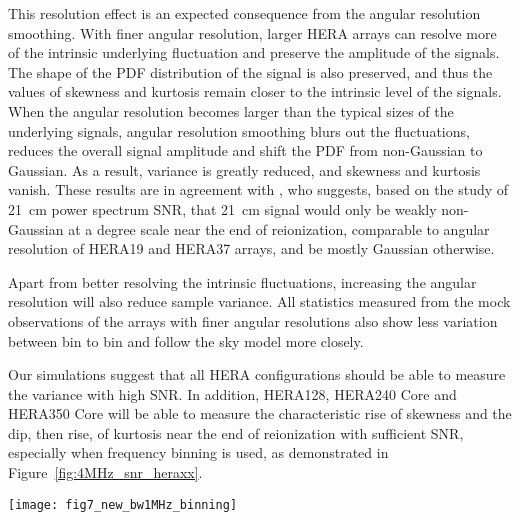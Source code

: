 \documentclass[fleqn,usenatbib]{mnras}
\begin{document}
This resolution effect is an expected consequence from the angular resolution smoothing. With finer angular resolution, larger HERA arrays can resolve more of the intrinsic underlying fluctuation and preserve the amplitude of the signals. The shape of the PDF distribution of the signal is also preserved, and thus the values of skewness and kurtosis remain closer to the intrinsic level of the signals. When the angular resolution becomes larger than the typical sizes of the underlying signals, angular resolution smoothing blurs out the fluctuations, reduces the overall signal amplitude and shift the PDF from non-Gaussian to Gaussian. As a result, variance is greatly reduced, and skewness and kurtosis vanish. These results are in agreement with \citet{2015MNRAS.449L..41M}, who suggests, based on the study of 21~cm power spectrum SNR, that 21~cm signal would only be weakly non-Gaussian at a degree scale near the end of reionization, comparable to angular resolution of HERA19 and HERA37 arrays, and be mostly Gaussian otherwise.

Apart from better resolving the intrinsic fluctuations, increasing the angular resolution will also reduce sample variance. All statistics measured from the mock observations of the arrays with finer angular resolutions also show less variation between bin to bin and follow the sky model more closely.

Our simulations suggest that all HERA configurations should be able to measure the variance with high SNR. In addition, HERA128, HERA240 Core and HERA350 Core will be able to measure the characteristic rise of skewness and the dip, then rise, of kurtosis near the end of reionization with sufficient SNR, especially when frequency binning is used, as demonstrated in Figure~\ref{fig:4MHz_snr_heraxx}. 

\begin{figure*}
    \texttt{[image: fig7\_new\_bw1MHz\_binning]}
    \caption{Mean drift scan statistics (left) and SNR (right) measured from the mock observations of all planned built-out HERA stages with 1-MHz frequency binning applied before the calculations. All HERA configurations should be able to measure the variance with high SNR. In addition, HERA128 and above will be able to measure the characteristic rise of skewness and the dip, then rise, of kurtosis near the end of reionization with sufficient SNR. The horizontal dashed lines on the statistics and SNR columns indicate zero statistical values and SNR=1 respectively.}
    \label{fig:4MHz_snr_heraxx}
\end{figure*}
\end{document}
